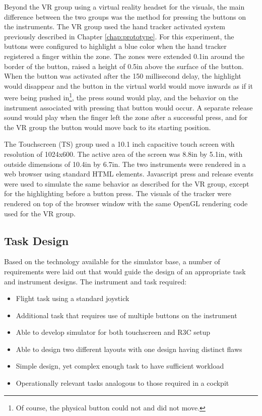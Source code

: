 Beyond the VR group using a virtual reality headset for the visuals, the main difference between the two groups was the method for pressing the buttons on the instruments.
The VR group used the hand tracker activated system previously described in Chapter \ref{chap:prototype}.
For this experiment, the buttons were configured to highlight a blue color when the hand tracker registered a finger within the zone.
The zones were extended 0.1in around the border of the button, raised a height of 0.5in above the surface of the button.
When the button was activated after the 150 millisecond delay, the highlight would disappear and the button in the virtual world would move inwards as if it were being pushed in\footnote{Of course, the physical button could not and did not move.}, the press sound would play, and the behavior on the instrument associated with pressing that button would occur.
A separate release sound would play when the finger left the zone after a successful press, and for the VR group the button would move back to its starting position.

The Touchscreen (TS) group used a 10.1 inch capacitive touch screen with resolution of 1024x600.
The active area of the screen was 8.8in by 5.1in, with outside dimensions of 10.4in by 6.7in.
The two instruments were rendered in a web browser using standard HTML elements.
Javascript press and release events were used to simulate the same behavior as described for the VR group, except for the highlighting before a button press.
The visuals of the tracker were rendered on top of the browser window with the same OpenGL rendering code used for the VR group.


\subsection{Task Design}

Based on the technology available for the simulator base, a number of requirements were laid out that would guide the design of an appropriate task and instrument designs.
The instrument and task required:

\begin{itemize}
    \item Flight task using a standard joystick
    \item Additional task that requires use of multiple buttons on the instrument
    \item Able to develop simulator for both touchscreen and R3C setup %
    \item Able to design two different layouts with one design having distinct flaws
    \item Simple design, yet complex enough task to have sufficient workload
    \item Operationally relevant tasks analogous to those required in a cockpit
\end{itemize}

